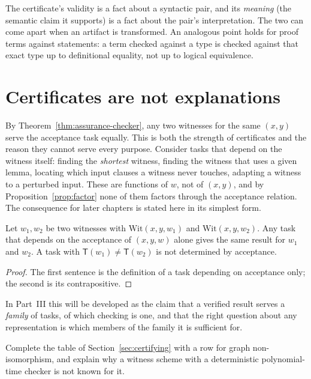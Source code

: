 The certificate's validity is a fact about a syntactic pair, and its \emph{meaning} (the semantic claim it supports) is a fact about the pair's interpretation. The two can come apart when an artifact is transformed. An analogous point holds for proof terms against statements: a term checked against a type is checked against that exact type up to definitional equality, not up to logical equivalence.

\section{Certificates are not explanations}
\label{sec:cert-vs-expl}

By Theorem~\ref{thm:assurance-checker}, any two witnesses for the same $(x,y)$ serve the acceptance task equally. This is both the strength of certificates and the reason they cannot serve every purpose. Consider tasks that depend on the witness itself: finding the \emph{shortest} witness, finding the witness that uses a given lemma, locating which input clauses a witness never touches, adapting a witness to a perturbed input. These are functions of $w$, not of $(x,y)$, and by Proposition~\ref{prop:factor} none of them factors through the acceptance relation. The consequence for later chapters is stated here in its simplest form.

\begin{proposition}
\label{prop:acceptance-invariant}
Let $w_1,w_2$ be two witnesses with $\mathrm{Wit}(x,y,w_1)$ and $\mathrm{Wit}(x,y,w_2)$. Any task that depends on the acceptance of $(x,y,w)$ alone gives the same result for $w_1$ and $w_2$. A task with $\mathsf{T}(w_1)\neq\mathsf{T}(w_2)$ is not determined by acceptance.
\end{proposition}

\begin{proof}
The first sentence is the definition of a task depending on acceptance only; the second is its contrapositive.
\end{proof}

In Part~III this will be developed as the claim that a verified result serves a \emph{family} of tasks, of which checking is one, and that the right question about any representation is which members of the family it is sufficient for.

\begin{exercise}
Complete the table of Section~\ref{sec:certifying} with a row for graph non-isomorphism, and explain why a witness scheme with a deterministic polynomial-time checker is not known for it.
\end{exercise}

